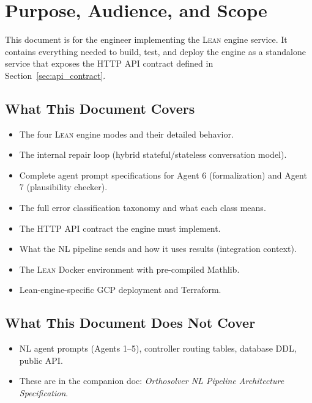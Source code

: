\documentclass[11pt,a4paper]{article}
\newcommand{\Lean}{\textsc{Lean}}
\begin{document}
\section{Purpose, Audience, and Scope}

This document is for the engineer implementing the \Lean{} engine service. It contains everything needed to build, test, and deploy the engine as a standalone service that exposes the HTTP API contract defined in Section~\ref{sec:api_contract}.

\subsection{What This Document Covers}
\begin{itemize}[leftmargin=2em]
  \item The four \Lean{} engine modes and their detailed behavior.
  \item The internal repair loop (hybrid stateful/stateless conversation model).
  \item Complete agent prompt specifications for Agent 6 (formalization) and Agent 7 (plausibility checker).
  \item The full error classification taxonomy and what each class means.
  \item The HTTP API contract the engine must implement.
  \item What the NL pipeline sends and how it uses results (integration context).
  \item The \Lean{} Docker environment with pre-compiled Mathlib.
  \item Lean-engine-specific GCP deployment and Terraform.
\end{itemize}

\subsection{What This Document Does \textbf{Not} Cover}
\begin{itemize}[leftmargin=2em]
  \item NL agent prompts (Agents 1--5), controller routing tables, database DDL, public API.
  \item These are in the companion doc: \textit{Orthosolver NL Pipeline Architecture Specification}.
\end{itemize}

\end{document}
